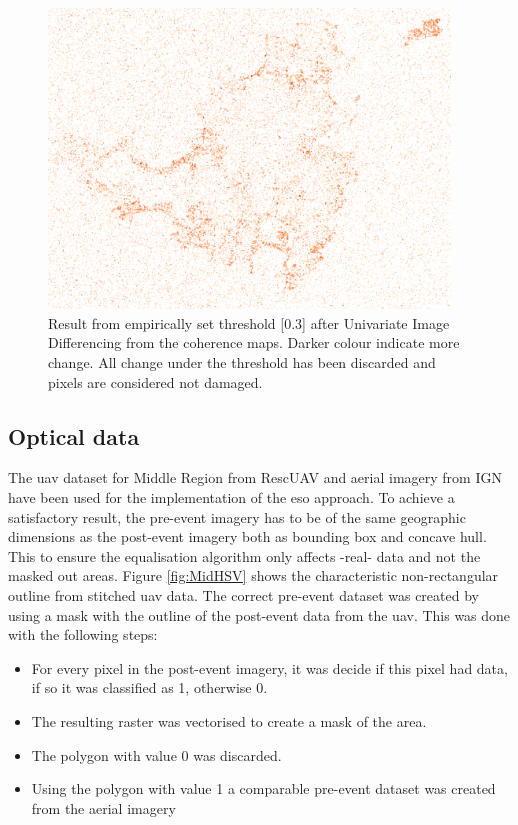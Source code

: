 \begin{figure}[!h]
	\centering
	\captionsetup{justification=raggedright,singlelinecheck=false}
	\includegraphics[width=0.95\textwidth]{figs/IntThres_03.png}
	\caption{\footnotesize{Result from empirically set threshold [0.3] after Univariate Image Differencing from the coherence maps. Darker colour indicate more change. All change under the threshold has been discarded and pixels are considered not damaged.}}
	\label{fig:YunOut}
\end{figure}

\subsection{Optical data}
The \ac{uav} dataset for Middle Region from RescUAV and aerial imagery from IGN have been used for the implementation of the \ac{eso} approach. To achieve a satisfactory result, the pre-event imagery has to be of the same geographic dimensions as the post-event imagery both as bounding box and concave hull. This to ensure the equalisation algorithm only affects -real- data and not the masked out areas. Figure \ref{fig:MidHSV} shows the characteristic non-rectangular outline from stitched \ac{uav} data. The correct pre-event dataset was created by using a mask with the outline of the post-event data from the \ac{uav}. This was done with the following steps:

\begin{itemize}
	\item For every pixel in the post-event imagery, it was decide if this pixel had data, if so it was classified as 1, otherwise 0.
	\item The resulting raster was vectorised to create a mask of the area.
	\item The polygon with value 0 was discarded.
	\item Using the polygon with value 1 a comparable pre-event dataset was created from the aerial imagery\\
\end{itemize} 

